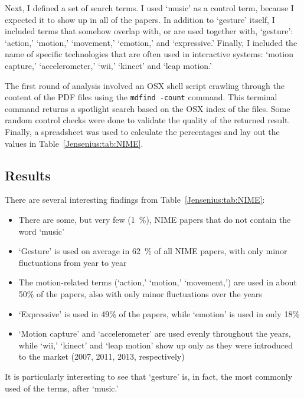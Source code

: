 Next, I defined a set of search terms. I used `music' as a control term, because I expected it to show up in all of the papers. In addition to `gesture' itself, I included terms that somehow overlap with, or are used together with, `gesture': `action,' `motion,' `movement,' `emotion,' and `expressive.' Finally, I included the name of specific technologies that are often used in interactive systems: `motion capture,' `accelerometer,' `wii,' `kinect' and `leap motion.' 

The first round of analysis involved an OSX shell script crawling through the content of the PDF files using the \texttt{mdfind -count} command. This terminal command returns a spotlight search based on the OSX index of the files. Some random control checks were done to validate the quality of the returned result. Finally, a spreadsheet was used to calculate the percentages and lay out the values in Table~\ref{Jensenius:tab:NIME}. 


\subsection{Results}

There are several interesting findings from Table~\ref{Jensenius:tab:NIME}: 

\begin{itemize}

\item There are some, but very few (1~\%), NIME papers that do not contain the word `music'

\item `Gesture' is used on average in 62~\% of all NIME papers, with only minor fluctuations from year to year

\item The motion-related terms (`action,' `motion,' `movement,') are used in about 50\% of the papers, also with only minor fluctuations over the years

\item `Expressive' is used in 49\% of the papers, while `emotion' is used in only 18\%

\item `Motion capture' and `accelerometer' are used evenly throughout the years, while `wii,' `kinect' and `leap motion' show up only as they were introduced to the market (2007, 2011, 2013, respectively)

\end{itemize}

It is particularly interesting to see that `gesture' is, in fact, the most commonly used of the terms, after `music.'


